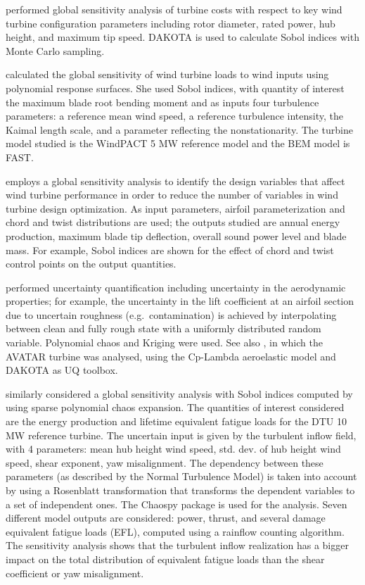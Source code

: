 \documentclass[review]{elsarticle}
\numberwithin{equation}{section}
\numberwithin{equation}{section}
\begin{document}
\cite{Dykes2014} performed global sensitivity analysis of turbine costs with respect to key wind turbine configuration parameters including rotor diameter, rated power, hub height, and maximum tip speed. DAKOTA is used to calculate Sobol indices with Monte Carlo sampling.

\cite{Rinker2016a} calculated the global sensitivity of wind turbine loads to wind inputs using polynomial response surfaces. She used Sobol indices, with quantity of interest the maximum blade root bending moment and as inputs four turbulence parameters: a reference mean wind speed, a reference turbulence intensity, the Kaimal length scale, and a parameter reflecting the nonstationarity. The turbine model studied is the WindPACT 5 MW reference model and the BEM model is FAST.

\cite{Echeverria2017} employs a global sensitivity analysis to identify the design variables that affect wind turbine performance in order to reduce the number of variables in wind turbine design optimization. As input parameters, airfoil parameterization and chord and twist distributions are used; the outputs studied are annual energy production, maximum blade tip deflection, overall sound power level and blade mass. For example, Sobol indices are shown for the effect of chord and twist control points on the output quantities.

\cite{Matthaus2017} performed uncertainty quantification including uncertainty in the aerodynamic properties; for example, the uncertainty in the lift coefficient at an airfoil section due to uncertain roughness (e.g.\ contamination) is achieved by interpolating between clean and fully rough state with a uniformly distributed random variable. Polynomial chaos and Kriging were used. See also \cite{Bortolotti2019}, in which the AVATAR turbine was analysed, using the Cp-Lambda aeroelastic model and DAKOTA as UQ toolbox. 

\cite{Murcia2018} similarly considered a global sensitivity analysis with Sobol indices computed by using sparse polynomial chaos expansion. The quantities of interest considered are the energy production and lifetime equivalent fatigue loads for the DTU 10 MW reference turbine. The uncertain input is given by the turbulent inflow field, with 4 parameters: mean hub height wind speed, std. dev. of hub height wind speed, shear exponent, yaw misalignment. The dependency between these parameters (as described by the Normal Turbulence Model) is taken into account by using a Rosenblatt transformation that transforms the dependent variables to a set of independent ones. The Chaospy package is used for the analysis. Seven different model outputs are considered: power, thrust, and several damage equivalent fatigue loads (EFL), computed using a rainflow counting algorithm. The sensitivity analysis shows that the turbulent inflow realization has a bigger impact on the total distribution of equivalent fatigue loads than the shear coefficient or yaw misalignment.
\end{document}
